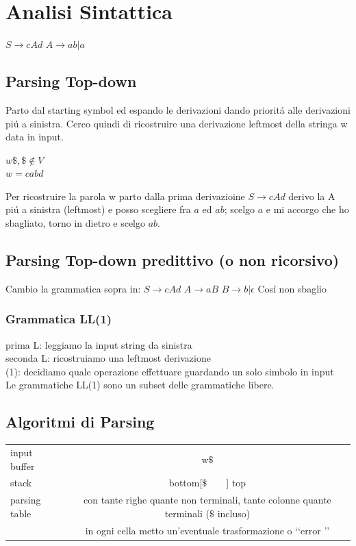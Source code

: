 \chapter{Analisi Sintattica}
$S \rightarrow cAd$
$A \rightarrow ab | a$

\section{Parsing Top-down}
Parto dal starting symbol ed espando le derivazioni dando priorit\'a alle derivazioni pi\'u a sinistra.
Cerco quindi di ricostruire una derivazione leftmost della stringa w data in input.

$w\$, \$ \not\in V$\\
$w=cabd$

Per ricostruire la parola w parto dalla prima derivazioine $S \rightarrow cAd$ derivo la A pi\'u a sinistra (leftmost) e posso scegliere 
fra $a$ ed $ab$; scelgo $a$ e mi accorgo che ho sbagliato, torno in dietro e scelgo $ab$.

\section{Parsing Top-down predittivo (o non ricorsivo)}
Cambio la grammatica sopra in: 
$S \rightarrow cAd$
$A \rightarrow aB$
$B \rightarrow b | \epsilon $
Cos\'i non sbaglio 

\subsection{Grammatica LL(1)}
prima L: leggiamo la input string da sinistra\\
seconda L: ricostruiamo una leftmost derivazione\\
(1): decidiamo quale operazione effettuare guardando un solo simbolo in input\\
Le grammatiche LL(1) sono un subset delle grammatiche libere.

\section{Algoritmi di Parsing}
\begin{tabular}{lc}
    input buffer    &   w$\$$   \\
    stack           &   bottom[$ \$ \qquad $] top \\
    parsing table   & con tante righe quante non terminali, tante colonne quante terminali ($ \$ $ incluso)\\
                    & in ogni cella metto un'eventuale trasformazione o \lq\lq error \rq\rq \\
\end{tabular}

